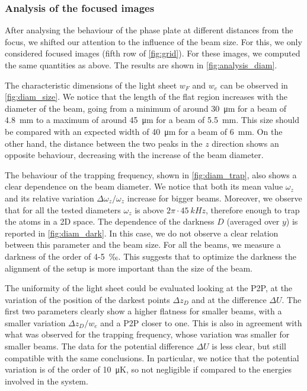 \subsubsection{Analysis of the focused images}
After analysing the behaviour of the phase plate at different distances from the focus, we shifted our attention to the influence of the beam size. For this, we only considered focused images (fifth row of \cref{fig:grid}). For these images, we computed the same quantities as above.
The results are shown in \cref{fig:analysis_diam}.

The characteristic dimensions of the light sheet $w_F$ and $w_e$ can be observed in \cref{fig:diam_size}. We notice that  the length of the flat region increases with the diameter of the beam, going from a minimum of around \SI{30}{\micro m} for a beam of \SI{4.8}{mm} to a maximum of around \SI{45}{\micro m} for a beam of \SI{5.5}{mm}. This size should be compared with an expected width of \SI{40}{\micro m} for a beam of \SI{6}{mm}. On the other hand, the distance between the two peaks in the $z$ direction shows an opposite behaviour, decreasing with the increase of the beam diameter.

The behaviour of the trapping frequency, shown in \cref{fig:diam_trap}, also shows a clear dependence on the beam diameter. We notice that both its mean value $\omega_z$ and its relative variation $\Delta \omega_z / \omega_z$ increase for bigger beams. Moreover, we observe that for all the tested diameters $\omega_z$ is above $2\pi\cdot\SI{45}{kHz}$, therefore enough to trap the atoms in a 2D space. The dependence of the darkness $D$ (averaged over $y$) is reported in \cref{fig:diam_dark}. In this case, we do not observe a clear relation between this parameter and the beam size. For all the beams, we measure a darkness of the order of 4-5~‰. This suggests that to optimize the darkness the alignment of the setup is more important than the size of the beam.

The uniformity of the light sheet could be evaluated looking at the P2P, at the variation of the position of the darkest points $\Delta z_D$ and at the difference $\Delta U$. The first two parameters clearly show a higher flatness for smaller beams, with a smaller variation $\Delta z_D / w_e$ and a P2P closer to one. This is also in agreement with what was observed for the trapping frequency, whose variation was smaller for smaller beams. The data for the potential difference $\Delta U$ is less clear, but still compatible with the same conclusions. In particular, we notice that the potential variation is of the order of \SI{10}{\micro K}, so not negligible if compared to the energies involved in the system.

